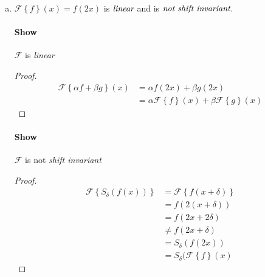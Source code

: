 \documentclass{paper}
\begin{document}
\begin{enumerate}[(a)]
\paragraph{Show} $\mathcal{F}$ is \emph{shift invariant} \\
\begin{proof}
\begin{align*}
    \mathcal{F} \left \{S_\delta (f(x)) \right\} 
    &= \mathcal{F} \left\{ f(x+\delta) \right\} \\
    &= \sum_{k=x-4+\delta}^{x+2+\delta} f(k) \\
    &= \sum_{k=x-4}^{x+2} f(k+\delta) \\
    &= S_{\delta}(\sum_{k=x-4}^{x+2} f(k)) \\
    &= S_\delta(\mathcal{F}\left \{f \right\}(x)
\end{align*}
\end{proof}

\item $\mathcal{F} \left \{ f \right\} (x) = f(2x)$ is $\emph{linear}$ and is $\emph{not shift invariant}$.

\paragraph{Show} $\mathcal{F}$ is \emph{linear} \\
\begin{proof}
\begin{align*}
    \mathcal{F} \left \{\alpha f + \beta g \right\}(x)
    &= \alpha f(2x) + \beta g(2x) \\
    &= \alpha \mathcal{F} \left \{f\right\}(x) + \beta \mathcal{F} \left \{g \right\}(x)
\end{align*}
\end{proof}

\paragraph{Show} $\mathcal{F}$ is not \emph{shift invariant} \\
\begin{proof}
\begin{align*}
    \mathcal{F} \left \{S_\delta (f(x)) \right\} 
    &= \mathcal{F} \left\{ f(x+\delta) \right\} \\
    &= f(2(x+\delta)) \\
    &= f(2x + 2\delta) \\
    &\neq f(2x + \delta) \\
    &= S_\delta (f(2x)) \\
    &= S_\delta(\mathcal{F}\left \{f \right\}(x)
\end{align*}
\end{proof}



\end{enumerate}
\end{document}
